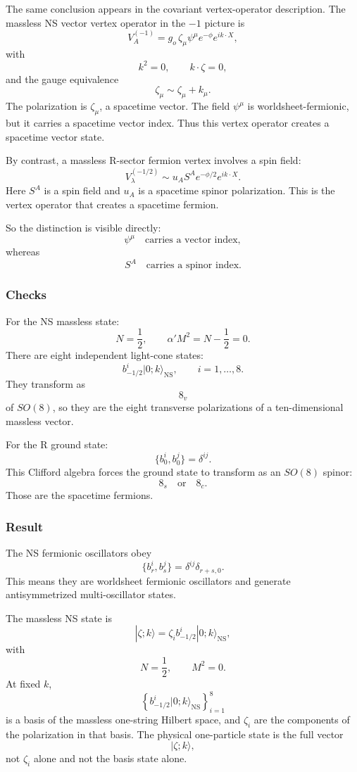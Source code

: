\documentclass[
  10pt,
  a4paper,
  openany]{book}
\begin{document}
The same conclusion appears in the covariant vertex-operator
description. The massless NS vector vertex operator in the \(-1\)
picture is \[
V_A^{(-1)}
=
g_o\,\zeta_\mu \psi^\mu e^{-\phi}e^{ik\cdot X},
\] with \[
k^2=0,
\qquad
k\cdot \zeta=0,
\] and the gauge equivalence \[
\zeta_\mu\sim \zeta_\mu+k_\mu.
\] The polarization is \(\zeta_\mu\), a spacetime vector. The field
\(\psi^\mu\) is worldsheet-fermionic, but it carries a spacetime vector
index. Thus this vertex operator creates a spacetime vector state.

By contrast, a massless R-sector fermion vertex involves a spin field:
\[
V_\lambda^{(-1/2)}
\sim
u_A S^A e^{-\phi/2}e^{ik\cdot X}.
\] Here \(S^A\) is a spin field and \(u_A\) is a spacetime spinor
polarization. This is the vertex operator that creates a spacetime
fermion.

So the distinction is visible directly: \[
\psi^\mu
\quad
\text{carries a vector index},
\] whereas \[
S^A
\quad
\text{carries a spinor index}.
\]

\subsubsection{Checks}\label{checks-9}

For the NS massless state: \[
N=\frac{1}{2},
\qquad
\alpha' M^2=N-\frac{1}{2}=0.
\] There are eight independent light-cone states: \[
b_{-1/2}^i|0;k\rangle_{\text{NS}},
\qquad
i=1,\dots,8.
\] They transform as \[
8_v
\] of \(SO(8)\), so they are the eight transverse polarizations of a
ten-dimensional massless vector.

For the R ground state: \[
\{b_0^i,b_0^j\}
=
\delta^{ij}.
\] This Clifford algebra forces the ground state to transform as an
\(SO(8)\) spinor: \[
8_s
\quad
\text{or}
\quad
8_c.
\] Those are the spacetime fermions.

\subsubsection{Result}\label{result-13}

The NS fermionic oscillators obey \[
\{b_r^i,b_s^j\}
=
\delta^{ij}\delta_{r+s,0}.
\] This means they are worldsheet fermionic oscillators and generate
antisymmetrized multi-oscillator states.

The massless NS state is \[
|\zeta;k\rangle
=
\zeta_i b_{-1/2}^i|0;k\rangle_{\text{NS}},
\] with \[
N=\frac{1}{2},
\qquad
M^2=0.
\] At fixed \(k\), \[
\left\{
b_{-1/2}^i|0;k\rangle_{\text{NS}}
\right\}_{i=1}^8
\] is a basis of the massless one-string Hilbert space, and \(\zeta_i\)
are the components of the polarization in that basis. The physical
one-particle state is the full vector \[
|\zeta;k\rangle,
\] not \(\zeta_i\) alone and not the basis state alone.
\end{document}
